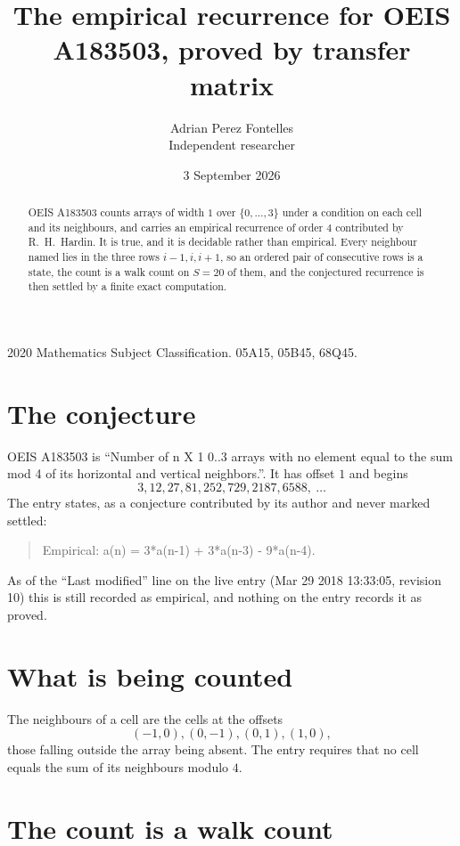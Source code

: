 \documentclass[11pt,a4paper]{article}
\title{The empirical recurrence for OEIS A183503, proved by transfer matrix}
\author{Adrian Perez Fontelles\\ \small Independent researcher}
\date{3 September 2026}
\theoremstyle{plain}
\theoremstyle{definition}
\begin{document}
\maketitle

\begin{abstract}
OEIS A183503 counts arrays of width $1$ over $\{0,\dots,3\}$ under a condition on each cell
and its neighbours, and carries an empirical recurrence of order $4$ contributed by
R.~H.~Hardin. It is true, and it is decidable rather than empirical. Every neighbour named lies
in the three rows $i-1,i,i+1$, so an ordered pair of consecutive rows is a state, the count is
a walk count on $S=20$ of them, and the conjectured recurrence is then settled by a finite
exact computation.
\end{abstract}

\noindent\small 2020 Mathematics Subject Classification. 05A15, 05B45, 68Q45.\normalsize

\section{The conjecture}

OEIS A183503 is ``Number of n X 1 0..3 arrays with no element equal to the sum mod 4 of its horizontal and vertical neighbors.''. It has offset $1$ and begins
\[
3, 12, 27, 81, 252, 729, 2187, 6588,\ \dots
\]
The entry states, as a conjecture contributed by its author and never marked settled:
\begin{quote}
Empirical: a(n) = 3*a(n-1) + 3*a(n-3) - 9*a(n-4).
\end{quote}
As of the ``Last modified'' line on the live entry (Mar 29 2018 13:33:05, revision 10) this is still
recorded as empirical, and nothing on the entry records it as proved.

\section{What is being counted}

The neighbours of a cell are the cells at the offsets
\[
(-1,0), (0,-1), (0,1), (1,0),
\]
those falling outside the array being absent. The entry requires that no cell equals the sum of its neighbours modulo $4$.

\section{The count is a walk count}
\end{document}
